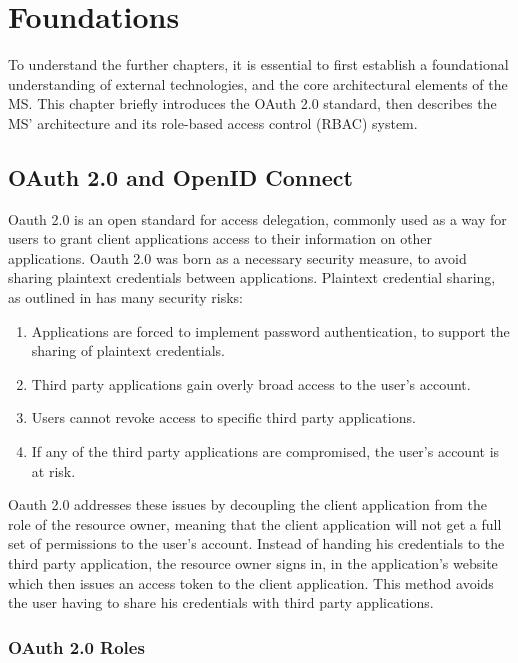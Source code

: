 \chapter{Foundations}
\label{cha:relatedwork}

To understand the further chapters,
it is essential to first establish a foundational understanding of 
external technologies, and the core architectural elements of the MS.
This chapter briefly introduces the OAuth 2.0 standard,
then describes the MS' architecture and its role-based access control (RBAC) system.

\section{OAuth 2.0 and OpenID Connect}
\label{cha:relatedwork:oauth}

Oauth 2.0 is an open standard for access delegation,
commonly used as a way for users to grant client applications access to their information on other applications.
Oauth 2.0 was born as a necessary security measure, to avoid sharing plaintext credentials between applications.
Plaintext credential sharing, as outlined in \cite{rfcOauth2} has many security risks:

\begin{enumerate}
	\item Applications are forced to implement password authentication, to support the sharing of plaintext credentials.
	\item Third party applications gain overly broad access to the user's account.
	\item Users cannot revoke access to specific third party applications.
	\item If any of the third party applications are compromised, the user's account is at risk.
\end{enumerate}

Oauth 2.0 addresses these issues by decoupling the client application from the role of the resource owner,
meaning that the client application will not get a full set of permissions to the user's account.
Instead of handing his credentials to the third party application,
the resource owner signs in, in the application's website which then issues an access token to the client application.
This method avoids the user having to share his credentials with third party applications.

\subsection{OAuth 2.0 Roles}

